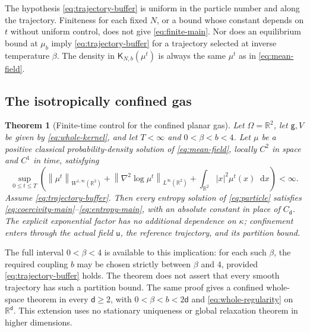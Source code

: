 \documentclass[11pt,reqno]{amsart}
\numberwithin{equation}{section}
\newtheorem{theorem}{Theorem}[section]
\theoremstyle{definition}
\theoremstyle{remark}
\newcommand{\R}{\mathbb R}
\newcommand{\g}{\mathsf g}
\renewcommand{\d}{\mathsf d}
\newcommand{\K}{\mathsf K}
\renewcommand{\u}{\mathsf u}
\newcommand{\dd}{\mathop{}\!\mathrm d}
\newcommand{\norm}[1]{\left\lVert#1\right\rVert}
\begin{document}
The hypothesis \eqref{eq:trajectory-buffer} is uniform in the particle number and along the trajectory. Finiteness for each fixed $N$, or a bound whose constant depends on $t$ without uniform control, does not give \eqref{eq:finite-main}. Nor does an equilibrium bound at $\mu_b$ imply \eqref{eq:trajectory-buffer} for a trajectory selected at inverse temperature $\beta$. The density in $\K_{N,b}(\mu^t)$ is always the same $\mu^t$ as in \eqref{eq:mean-field}.

\subsection{The isotropically confined gas}
\begin{theorem}[Finite-time control for the confined planar gas]\label{thm:planar-finite}
Let $\Omega=\R^2$, let $\g,V$ be given by \eqref{eq:whole-kernel}, and let $T<\infty$ and $0<\beta<b<4$. Let $\mu$ be a positive classical probability-density solution of \eqref{eq:mean-field}, locally $C^2$ in space and $C^1$ in time, satisfying
\begin{equation}\label{eq:whole-regularity}
 \sup_{0\leq t\leq T}\left(
 \norm{\mu^t}_{W^{1,\infty}(\R^2)}+
 \norm{\nabla^2\log\mu^t}_{L^\infty(\R^2)}+
 \int_{\R^2}|x|^2\mu^t(x)\dd x\right)<\infty.
\end{equation}
Assume \eqref{eq:trajectory-buffer}. Then every entropy solution of \eqref{eq:particle} satisfies \eqref{eq:coercivity-main}--\eqref{eq:entropy-main}, with an absolute constant in place of $C_\d$. The explicit exponential factor has no additional dependence on $\kappa$; confinement enters through the actual field $\u$, the reference trajectory, and its partition bound.
\end{theorem}

The full interval $0<\beta<4$ is available to this implication: for each such $\beta$, the required coupling $b$ may be chosen strictly between $\beta$ and $4$, provided \eqref{eq:trajectory-buffer} holds. The theorem does not assert that every smooth trajectory has such a partition bound. The same proof gives a confined whole-space theorem in every $\d\geq2$, with $0<\beta<b<2\d$ and \eqref{eq:whole-regularity} on $\R^\d$. This extension uses no stationary uniqueness or global relaxation theorem in higher dimensions.
\end{document}
